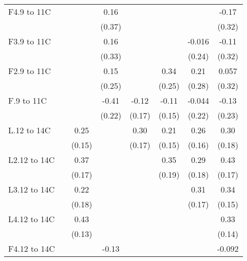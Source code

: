 \documentclass[paper=letterpaper, fontsize=11pt]{article} %
\begin{document}
{\begin{landscape}
\begin{longtable}{l*{7}{c}}
F4.9 to 11C         &            &            &        0.16&            &            &            &       -0.17\\
                    &            &            &      (0.37)&            &            &            &      (0.32)\\
F3.9 to 11C         &            &            &        0.16&            &            &      -0.016&       -0.11\\
                    &            &            &      (0.33)&            &            &      (0.24)&      (0.32)\\
F2.9 to 11C         &            &            &        0.15&            &        0.34&        0.21&       0.057\\
                    &            &            &      (0.25)&            &      (0.25)&      (0.28)&      (0.32)\\
F.9 to 11C          &            &            &       -0.41&       -0.12&       -0.11&      -0.044&       -0.13\\
                    &            &            &      (0.22)&      (0.17)&      (0.15)&      (0.22)&      (0.23)\\
L.12 to 14C         &            &        0.25&            &        0.30&        0.21&        0.26&        0.30\\
                    &            &      (0.15)&            &      (0.17)&      (0.15)&      (0.16)&      (0.18)\\
L2.12 to 14C        &            &        0.37&            &            &        0.35&        0.29&        0.43\\
                    &            &      (0.17)&            &            &      (0.19)&      (0.18)&      (0.17)\\
L3.12 to 14C        &            &        0.22&            &            &            &        0.31&        0.34\\
                    &            &      (0.18)&            &            &            &      (0.17)&      (0.15)\\
L4.12 to 14C        &            &        0.43&            &            &            &            &        0.33\\
                    &            &      (0.13)&            &            &            &            &      (0.14)\\
F4.12 to 14C        &            &            &       -0.13&            &            &            &      -0.092\\

\end{longtable}
\end{landscape}}
\end{document}
